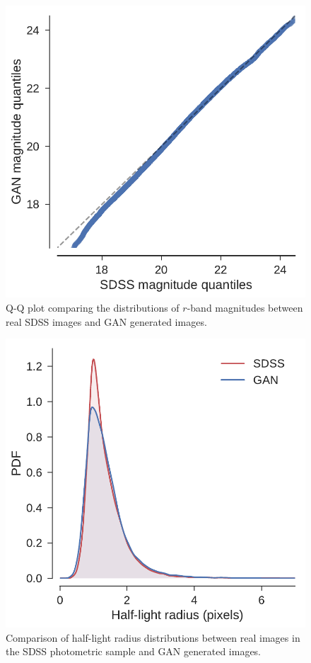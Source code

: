 \begin{figure}
  \centering
  \includegraphics[width=\columnwidth]{figures/mag_qq.pdf}
  \caption{Q-Q plot comparing the distributions of $r$-band magnitudes between real SDSS images and GAN generated images.}
  \label{fig:mag_qq}
\end{figure}

\begin{figure}
  \centering
  \includegraphics[width=\columnwidth]{figures/size_kde.pdf}
  \caption{Comparison of half-light radius distributions between real images in the SDSS photometric sample
  and GAN generated images.}
  \label{fig:size_kde}
\end{figure}

